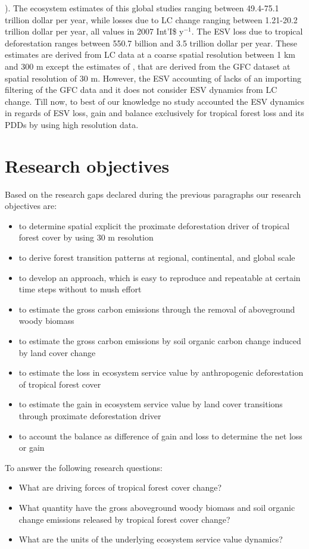 \citet{Costanza1997,Costanza2014,Sannigrahi2018,Song2018}). The ecosystem estimates of this global studies ranging between 49.4-75.1 trillion dollar per year, while losses due to \ac{LC} change ranging between 1.21-20.2 trillion dollar per year, all values in 2007 Int'I\$ y$^{-1}$. The \ac{ESV} loss due to tropical deforestation ranges between 550.7 billion and 3.5 trillion dollar per year. These estimates are derived from \ac{LC} data at a coarse spatial resolution between 1 km and 300 m except the estimates of \citeauthor{Song2018}, that are derived from the \ac{GFC} dataset at spatial resolution of 30 m. However, the \ac{ESV} accounting of \citeauthor{Song2018} lacks of an importing filtering of the \ac{GFC} data and it does not consider \ac{ESV} dynamics from \ac{LC} change. Till now, to best of our knowledge no study accounted the \ac{ESV} dynamics in regards of \ac{ESV} loss, gain and balance exclusively for tropical forest loss and its \acp{PDD} by using high resolution data.

	\section{Research objectives}
		Based on the research gaps declared during the previous paragraphs our research objectives are:
		\begin{itemize}
			\item to determine spatial explicit the proximate deforestation driver of tropical forest cover by using 30 m resolution
			\item to derive forest transition patterns at regional, continental, and global scale
			\item to develop an approach, which is easy to reproduce and repeatable at certain time steps without to mush effort
			\item to estimate the gross carbon emissions through the removal of aboveground woody biomass
			\item to estimate the gross carbon emissions by soil organic carbon change induced by land cover change
			\item to estimate the loss in ecosystem service value by anthropogenic deforestation of tropical forest cover
			\item to estimate the gain in ecosystem service value by land cover transitions through proximate deforestation driver
			\item to account the balance as difference of gain and loss to determine the net loss or gain
		\end{itemize}
		To answer the following research questions:
		\begin{itemize}
			\item What are driving forces of tropical forest cover change?
			\item What quantity have the gross aboveground woody biomass and soil organic change emissions released by tropical forest cover change?
			\item What are the units of the underlying ecosystem service value dynamics?
		\end{itemize}